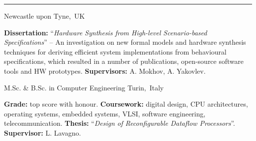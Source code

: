 \vspace{-3mm}
\rule{\textwidth}{0.5pt}\vspace{-1mm}

\begin{cventries}
\vspace{-5mm}

\cventry
{} %
{} %
{\vspace{-9mm}\normalcolor Newcastle upon Tyne,~UK} %
{} %
{ %
\begin{cvitems}
\textbf{Dissertation:} ``\textit{Hardware Synthesis from High-level 
Scenario-based 
Specifications}'' -- An investigation on new formal models and 
hardware synthesis techniques for deriving efficient system implementations 
from behavioural specifications, which resulted in a number of publications,
open-source software tools and HW prototypes.
\textbf{Supervisors:} A. Mokhov, A. Yakovlev.
\end{cvitems}
}
\vspace{-4mm}

\cventry
{}
{\vspace{-9mm}M.Sc. \& B.Sc. in Computer Engineering }
{\vspace{-9mm} \normalcolor Turin,~Italy}
{}
{
\begin{cvitems}
\textbf{Grade:} top score with honour. \textbf{Coursework:} 
digital design, CPU architectures, operating systems, embedded systems, VLSI,
software engineering, telecommunication. \textbf{Thesis:} 
``\emph{Design of Reconfigurable Dataflow Processors}''. \textbf{Supervisor:} 
L. Lavagno.
\end{cvitems}
}


\end{cventries}
